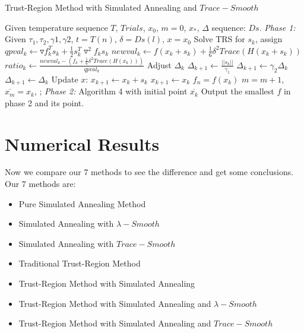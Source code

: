 \documentclass[letterpaper,12pt,titlepage,oneside,final]{book}
\begin{document}
\begin{algorithm} [H]
\caption{Trust-Region Method with Simulated Annealing and $Trace-Smooth$}
\begin{algorithmic} 
\STATE Given temperature sequence $T$, $Trials$, $x_0$, $m=0$, $x_*$, $\Delta$ sequence: $Ds$.
\STATE \emph{Phase 1:}
\STATE Given $\tau_1, \tau_2, \gamma1, \gamma2$, $t=T(n)$, $\delta=Ds(l)$, $x=x_0$
\STATE  Solve TRS for $s_k$, assign $qpval_k \leftarrow \triangledown  f^T_ks_k+\frac{1}{2}s^T_k \triangledown^2f_ks_k$
\STATE  $newval_k\leftarrow f(x_k+s_k)+\frac{1}{6}\delta^2Trace(H(x_k+s_k))$
\STATE  $ratio_k\leftarrow \frac{newval_k-(f_k+\frac{1}{6}\delta^2Trace(H(x_k)))}{qpval_k}$
\STATE  Adjust $\Delta_k$
\STATE $\Delta_{k+1}\leftarrow \frac{||s_k||}{\gamma_1}$
\ELSE 
{}
\STATE $\Delta_{k+1}\leftarrow \gamma_2 \Delta_k$
\ELSE 
\STATE $\Delta_{k+1}\leftarrow \Delta_k$
\ENDIF
\ENDIF
\STATE Update $x$:
\STATE $x_{k+1}\leftarrow x_k+s_k$
\ELSE 
\STATE $x_{k+1}\leftarrow x_k$
\ENDIF
\ENDWHILE
\STATE $f_n=f(x_k)$
\STATE $m=m+1$, $\overline{x_m}=x_k$, ;
\ENDIF
\ENDFOR
\ENDFOR
\STATE  
\STATE \emph{Phase 2:}
\STATE Algorithm 4 with initial point $\overline{x_k}$
\ENDFOR
\STATE Output the smallest $f$ in phase 2 and its point.
\end{algorithmic}
\end{algorithm}

\section{Numerical Results}

Now we compare our 7 methods to see the difference and get some conclusions. Our 7 methods are:

\begin{itemize}

\item Pure Simulated Annealing Method

\item Simulated Annealing with $\lambda-Smooth$

\item Simulated Annealing with $Trace-Smooth$

\item Traditional Trust-Region Method

\item Trust-Region Method with Simulated Annealing

\item Trust-Region Method with Simulated Annealing and $\lambda-Smooth$

\item Trust-Region Method with Simulated Annealing and $Trace-Smooth$

\end{itemize}
\end{document}
